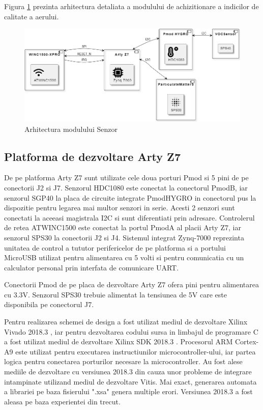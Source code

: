 Figura \ref{fig:PI_SensorUnitDiagram} prezinta arhitectura detaliata a modulului de achizitionare a indicilor de calitate a aerului.
\begin{figure}[H]
    \centering
    \includegraphics[scale=0.5]{figs/PI_SensorUnitDiagram.png}
    \caption{Arhitectura modulului Senzor}
    \label{fig:PI_SensorUnitDiagram}
\end{figure} 

\subsection{Platforma de dezvoltare Arty Z7}\label{subsec:pi_senzor_artyz7}
De pe platforma Arty Z7 sunt utilizate cele doua porturi Pmod si 5 pini de pe conectorii J2 si J7. Senzorul HDC1080 este conectat la conectorul PmodB, iar senzorul 
SGP40 la placa de circuite integrate PmodHYGRO in conectorul pus la dispozitie pentru legarea mai multor senzori in serie. Acesti 2 senzori sunt conectati la aceeasi 
magistrala I2C si sunt diferentiati prin adresare. Controlerul de retea ATWINC1500 este conectat la portul PmodA al placii Arty Z7, iar senzorul SPS30 la conectorii J2 
si J4. Sistemul integrat Zynq-7000 reprezinta unitatea de control a tututor perifericelor de pe platforma si a portului MicroUSB utilizat pentru alimentarea cu 5 volti 
si pentru comunicatia cu un calculator personal prin interfata de comunicare UART. 

Conectorii Pmod de pe placa de dezvoltare Arty Z7 ofera pini pentru alimentarea cu 3.3V. Senzorul SPS30 trebuie alimentat la tensiunea de 5V care este disponibila pe 
conectorul J7. 

Pentru realizarea schemei de design a fost utilizat mediul de dezvoltare Xilinx Vivado 2018.3 \cite{zynq7000ug892}, iar pentru dezvoltarea codului sursa in limbajul 
de programare C a fost utilizat mediul de dezvoltare Xilinx SDK 2018.3 \cite{zynq7000ug1145}. Procesorul ARM Cortex-A9 \cite{zynq7000ug585} este utilizat pentru 
executarea instructiunilor microcontroller-ului, iar partea logica pentru conectarea porturilor necesare la microcontroller. Au fost alese mediile de dezvoltare cu 
versiunea 2018.3 din cauza unor probleme de integrare intampinate utilizand mediul de dezvoltare Vitis. Mai exact, generarea automata a librariei pe baza fisierului 
".xsa" genera multiple erori. Versiunea 2018.3 a fost aleasa pe baza experientei din trecut.


